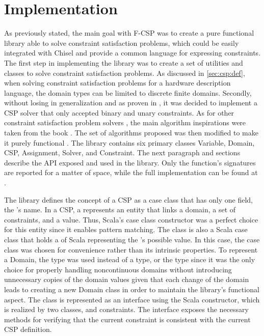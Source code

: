 \section{Implementation}
As previously stated, the main goal with F-CSP was to create a pure functional
library able to solve constraint satisfaction problems, which could be easily
integrated with Chisel and provide a common language for expressing constraints.
The first step in implementing the library was to create a set of utilities and
classes to solve constraint satisfaction problems. As discussed in
\ref{sec:csp:def}, when solving constraint satisfaction problems for a hardware
description language, the domain types can be limited to discrete finite
domains. Secondly, without losing in generalization and as proven in
\cite{russell2002artificial}, it was decided to implement a CSP solver that only
accepted binary and unary constraints. As for other constraint satisfaction
problem solvers \cite{online:scala-csp, online:csp-solver-scala}, the main
algorithm inspirations were taken from the book \cite{russell2002artificial}.
The set of algorithms proposed was then modified to make it purely functional
\cite{github:f-csp}. The library contains six primary classes Variable, Domain,
CSP, Assignment, Solver, and Constraint. The next paragraph and sections
describe the API exposed and used in the library. Only the function's signatures
are reported for a matter of space, while the full implementation can be found
at \cite{github:f-csp}.

The library defines the concept of a CSP  as a case class that
has only one field, the 's name. In a CSP, a 
represents an entity that links a domain, a set of constraints, and a value.
Thus, Scala's case class constructor was a perfect choice for this entity since
it enables pattern matching. The  class is also a Scala case class
that holds a  of Scala  representing the
's possible value. In this case, the case class was chosen for
convenience rather than its intrinsic properties. To represent a Domain, the
 type was used instead of a  type, or the 
type since it was the only choice for properly handling noncontinuous domains
without introducing unnecessary copies of the domain values given that each
change of the domain leads to creating a new Domain class in order to maintain
the library's functional aspect. The  class is represented as
an interface using the Scala  constructor, which is realized by two
classes,  and  constraints. The interface exposes the
necessary methods for verifying that the current constraint is consistent with
the current CSP definition.


